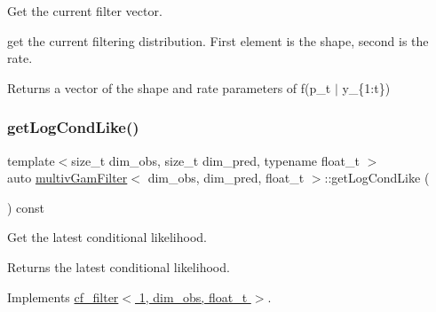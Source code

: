 Get the current filter vector. 

get the current filtering distribution. First element is the shape, second is the rate. \begin{DoxyReturn}{Returns}
a vector of the shape and rate parameters of f(p\+\_\+t $\vert$ y\+\_\+\{1\+:t\}) 
\end{DoxyReturn}
\mbox{\label{classmultivGamFilter_ae32c76dd1096041f358962f93de64a99}} 
\subsubsection{\texorpdfstring{get\+Log\+Cond\+Like()}{getLogCondLike()}}
{\footnotesize\ttfamily template$<$size\+\_\+t dim\+\_\+obs, size\+\_\+t dim\+\_\+pred, typename float\+\_\+t $>$ \\
auto \hyperlink{classmultivGamFilter}{multiv\+Gam\+Filter}$<$ dim\+\_\+obs, dim\+\_\+pred, float\+\_\+t $>$\+::get\+Log\+Cond\+Like (\begin{DoxyParamCaption}{ }\end{DoxyParamCaption}) const\hspace{0.3cm}{\ttfamily [virtual]}}



Get the latest conditional likelihood. 

\begin{DoxyReturn}{Returns}
the latest conditional likelihood. 
\end{DoxyReturn}


Implements \hyperlink{classcf__filter_a11b26307172bf94b8075ed2cdb8fc09c}{cf\+\_\+filter$<$ 1, dim\+\_\+obs, float\+\_\+t $>$}.

\mbox{\label{classmultivGamFilter_a9e77dfe0fc57ab01005bc054eca37dfa}} 
